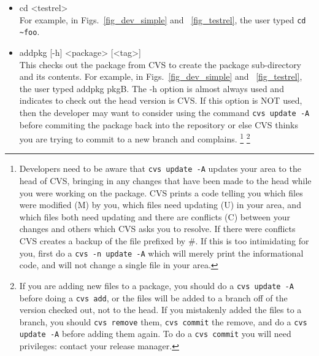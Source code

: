 \documentclass[12pt]{article}
\begin{document}
\begin{itemize}
\item {\ttfamily cd <testrel>}\\
      For example, in Figs.~\ref{fig_dev_simple} and ~\ref{fig_testrel},
the user typed {\ttfamily \verb|cd ~foo|}.
\item {\ttfamily addpkg [-h] <package> [<tag>]}\\
This checks out the package from CVS to create the package sub-directory
and its contents. 
For example, in Figs.~\ref{fig_dev_simple} and ~\ref{fig_testrel},
the user typed {\ttfamily addpkg pkgB}.
The -h option is almost always used and indicates to check out the head 
version is CVS. If this option is NOT used, then the developer may want
to consider using the command 
\texttt{cvs update -A} 
before commiting the package back into the
repository or else CVS thinks you are trying to 
commit to a new branch and
complains.
\footnote{ 
Developers need to be aware that 
\texttt{cvs update -A} updates your area to
the head of CVS, bringing in any changes that have been made 
to the head 
while you were working on the package.  CVS 
prints a code telling you which files were modified (M) by you, which files 
need
updating (U) in your area, and which files both need updating and there are
conflicts (C) between your changes and others which 
CVS asks you to resolve.
If there were conflicts CVS creates a backup of 
the file prefixed by \#.
If this is too intimidating for you, 
first do a \texttt{cvs -n update -A} which will 
merely print the informational code, and will not change a single file in your 
area.}
\footnote{
If you are adding new files to a package, you should do a 
\texttt{cvs update -A} before doing a 
\texttt{cvs add}, or the files will be 
added to a branch off of the version checked out, not to the head.  If you 
mistakenly added the files to a branch, you should 
\texttt{cvs remove} them, 
\texttt{cvs commit} the remove, and do a 
\texttt{cvs update -A} before adding 
them again. To do a \texttt{cvs commit} you will need privileges: contact
your release manager.}



\end{itemize}
\end{document}
